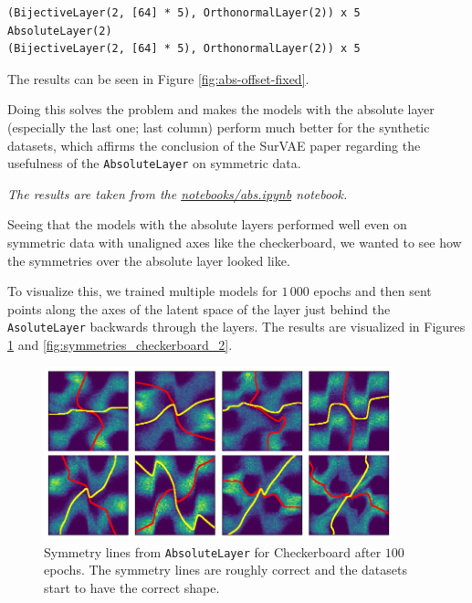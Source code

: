 \begin{verbatim}
(BijectiveLayer(2, [64] * 5), OrthonormalLayer(2)) x 5
AbsoluteLayer(2)
(BijectiveLayer(2, [64] * 5), OrthonormalLayer(2)) x 5
\end{verbatim}

The results can be seen in Figure \ref{fig:abs-offset-fixed}.

Doing this solves the problem and makes the models with the absolute layer (especially the last one; last column) perform much better for the synthetic datasets, which affirms the conclusion of the SurVAE paper regarding the usefulness of the \texttt{AbsoluteLayer} on symmetric data.


\textit{The results are taken from the \href{https://github.com/xiaoxiae/GNNFinal2024/blob/main/notebooks/abs.ipynb}{notebooks/abs.ipynb} notebook.}

Seeing that the models with the absolute layers performed well even on symmetric data with unaligned axes like the checkerboard, we wanted to see how the symmetries over the absolute layer looked like.

To visualize this, we trained multiple models for $1\,000$ epochs and then sent points along the axes of the latent space of the layer just behind the \texttt{AsoluteLayer} backwards through the layers. The results are visualized in Figures \ref{fig:symmetries_checkerboard} and \ref{fig:symmetries_checkerboard_2}. 


\begin{figure}[H]
    \centering
    \includegraphics[width=0.9\textwidth]{images/synthetic/symmetry_lines/symmetry lines 3.png}
    \caption{Symmetry lines from \texttt{AbsoluteLayer} for Checkerboard after $100$ epochs. The symmetry lines are roughly correct and the datasets start to have the correct shape.}
    \label{fig:symmetries_checkerboard}
\end{figure}

